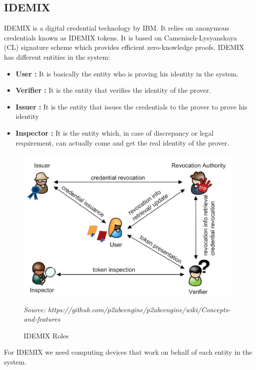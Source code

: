 \subsection{IDEMIX}
IDEMIX is a digital credential technology by IBM. It relies on anonymous credentials known as IDEMIX tokens. It is based on Camenisch-Lysyanskaya (CL) signature scheme which provides efficient zero-knowledge proofs. IDEMIX  has different entities in the system:
\begin{itemize}
	\item \textbf{User :} It is basically the entity who is proving his identity in the system.
	\item \textbf{Verifier :} It is the entity that verifies the identity of the prover.
	\item \textbf{Issuer :} It is the entity that issues the credentials to the prover to prove his identity
	\item \textbf{Inspector :} It is the entity which, in case of discrepancy or legal requirement, can actually come and get the real identity of the prover.
\end{itemize}
\begin{figure}[h]
	\centering
	\includegraphics[width=\textwidth]{figures/Roles}
	\begin{minipage}{\textwidth}
		\footnotesize
		\emph{Source: https://github.com/p2abcengine/p2abcengine/wiki/Concepts-and-features}
	\end{minipage}
	\caption{IDEMIX Roles}
	\label{fig:Roles}
\end{figure}

For IDEMIX we need computing devices that work on behalf of each entity in the system.
